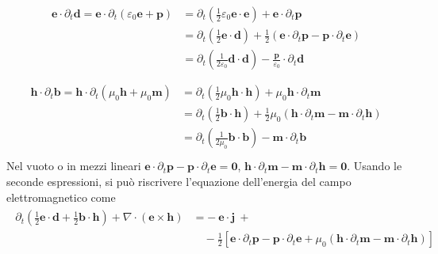 \documentclass[letterpaper,10pt,english]{jupyterBook}
\begin{document}
\begin{equation*}
\begin{split}\begin{aligned}
  \mathbf{e} \cdot \partial_t \mathbf{d}
    = \mathbf{e} \cdot \partial_t \left( \varepsilon_0 \mathbf{e} + \mathbf{p} \right) 
  & = \partial_t \left( \frac{1}{2} \varepsilon_0 \mathbf{e} \cdot \mathbf{e} \right) + \mathbf{e} \cdot \partial_t \mathbf{p} \\
  & = \partial_t \left( \frac{1}{2} \mathbf{e} \cdot \mathbf{d} \right) + \frac{1}{2} \left( \mathbf{e} \cdot \partial_t \mathbf{p} - \mathbf{p} \cdot \partial_t \mathbf{e} \right) \\
  & = \partial_t \left( \frac{1}{2 \varepsilon_0} \mathbf{d} \cdot \mathbf{d} \right) - \frac{\mathbf{p}}{\varepsilon_0} \cdot \partial_t \mathbf{d} \\
\end{aligned}\end{split}
\end{equation*}\begin{equation*}
\begin{split}\begin{aligned}
  \mathbf{h} \cdot \partial_t \mathbf{b}
    = \mathbf{h} \cdot \partial_t \left( \mu_0 \mathbf{h} + \mu_0 \mathbf{m} \right) 
  & = \partial_t \left( \frac{1}{2} \mu_0 \mathbf{h} \cdot \mathbf{h} \right) + \mu_0 \mathbf{h} \cdot \partial_t \mathbf{m} \\
  & = \partial_t \left( \frac{1}{2} \mathbf{b} \cdot \mathbf{h} \right) + \frac{1}{2} \mu_0 \left( \mathbf{h} \cdot \partial_t \mathbf{m} - \mathbf{m} \cdot \partial_t \mathbf{h} \right) \\
  & = \partial_t \left( \frac{1}{2 \mu_0} \mathbf{b} \cdot \mathbf{b} \right) - \mathbf{m} \cdot \partial_t \mathbf{b} \\
\end{aligned}\end{split}
\end{equation*}
\sphinxAtStartPar
Nel vuoto o in mezzi lineari \(\mathbf{e} \cdot \partial_t \mathbf{p} - \mathbf{p} \cdot \partial_t \mathbf{e} = \mathbf{0}\), \(\mathbf{h} \cdot \partial_t \mathbf{m} - \mathbf{m} \cdot \partial_t \mathbf{h} = \mathbf{0}\). Usando le seconde espressioni, si può riscrivere l’equazione dell’energia del campo elettromagnetico come
\begin{equation*}
\begin{split}\begin{aligned}
  \partial_t \left( \frac{1}{2} \mathbf{e} \cdot \mathbf{d} + \frac{1}{2} \mathbf{b} \cdot \mathbf{h} \right) + \nabla \cdot \left( \mathbf{e} \times \mathbf{h} \right) & = - \ \mathbf{e} \cdot \mathbf{j} \ + \\
   & \quad - \frac{1}{2} \left[ \mathbf{e} \cdot \partial_t \mathbf{p} - \mathbf{p} \cdot \partial_t \mathbf{e} + \mu_0 \left(  \mathbf{h} \cdot \partial_t \mathbf{m} - \mathbf{m} \cdot \partial_t \mathbf{h} \right) \right]
\end{aligned}\end{split}
\end{equation*}
\end{document}
